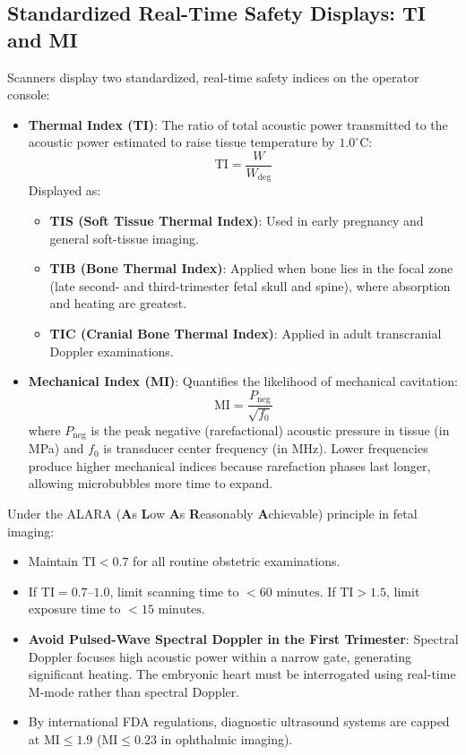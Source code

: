 \documentclass[11pt,a4paper]{article}
\begin{document}
\subsection{Standardized Real-Time Safety Displays: TI and MI}
Scanners display two standardized, real-time safety indices on the operator console:
\begin{itemize}[leftmargin=*]
    \item \textbf{Thermal Index (TI)}: The ratio of total acoustic power transmitted to the acoustic power estimated to raise tissue temperature by $1.0^\circ\text{C}$:
    \begin{equation}
        \text{TI} = \frac{W}{W_{\text{deg}}}
    \end{equation}
    Displayed as:
    \begin{itemize}
        \item \textbf{TIS (Soft Tissue Thermal Index)}: Used in early pregnancy and general soft-tissue imaging.
        \item \textbf{TIB (Bone Thermal Index)}: Applied when bone lies in the focal zone (late second- and third-trimester fetal skull and spine), where absorption and heating are greatest.
        \item \textbf{TIC (Cranial Bone Thermal Index)}: Applied in adult transcranial Doppler examinations.
    \end{itemize}
    \item \textbf{Mechanical Index (MI)}: Quantifies the likelihood of mechanical cavitation:
    \begin{equation}
        \text{MI} = \frac{P_{\text{neg}}}{\sqrt{f_0}}
    \end{equation}
    where $P_{\text{neg}}$ is the peak negative (rarefactional) acoustic pressure in tissue (in MPa) and $f_0$ is transducer center frequency (in MHz). Lower frequencies produce higher mechanical indices because rarefaction phases last longer, allowing microbubbles more time to expand.
\end{itemize}

\begin{ultrasoundsafety}
Under the ALARA (\textbf{A}s \textbf{L}ow \textbf{A}s \textbf{R}easonably \textbf{A}chievable) principle in fetal imaging:
\begin{itemize}
    \item Maintain $\text{TI} < 0.7$ for all routine obstetric examinations.
    \item If $\text{TI} = 0.7\text{--}1.0$, limit scanning time to $<60\text{ minutes}$. If $\text{TI} > 1.5$, limit exposure time to $<15\text{ minutes}$.
    \item \textbf{Avoid Pulsed-Wave Spectral Doppler in the First Trimester}: Spectral Doppler focuses high acoustic power within a narrow gate, generating significant heating. The embryonic heart must be interrogated using real-time M-mode rather than spectral Doppler.
    \item By international FDA regulations, diagnostic ultrasound systems are capped at $\text{MI} \le 1.9$ ($\text{MI} \le 0.23$ in ophthalmic imaging).
\end{itemize}
\end{ultrasoundsafety}
\end{document}
